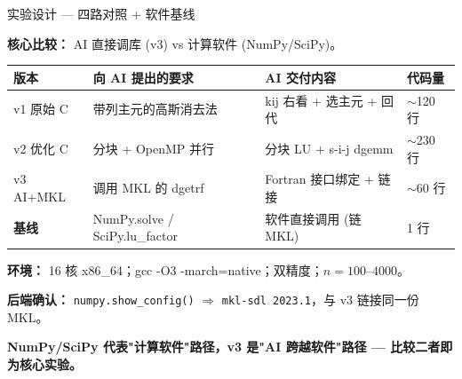 \documentclass[12pt,aspectratio=169]{beamer}
\begin{document}
\begin{frame}[shrink]{实验设计 — 四路对照 + 软件基线}

\textbf{核心比较：} AI 直接调库 (v3) vs 计算软件 (NumPy/SciPy)。

\vspace{4pt}
\footnotesize
\begin{center}
\renewcommand{\arraystretch}{1.2}
\begin{tabular}{@{}l p{4.3cm} p{4.7cm} p{1.6cm}@{}}
\toprule
\textbf{版本} & \textbf{向 AI 提出的要求} & \textbf{AI 交付内容} & \textbf{代码量} \\
\midrule
v1 原始 C   & 带列主元的高斯消去法 & kij 右看 + 选主元 + 回代 & $\sim$120 行 \\
v2 优化 C   & 分块 + OpenMP 并行 & 分块 LU + s-i-j dgemm & $\sim$230 行 \\
v3 AI+MKL   & 调用 MKL 的 dgetrf & Fortran 接口绑定 + 链接 & $\sim$60 行 \\
\textbf{基线} & NumPy.solve / SciPy.lu\_factor & 软件直接调用 (链 MKL) & 1 行 \\
\bottomrule
\end{tabular}
\end{center}
\normalsize

\vspace{4pt}
\small
\textbf{环境：} 16 核 x86\_64；gcc -O3 -march=native；双精度；$n=100$–$4000$。

\textbf{后端确认：} \texttt{numpy.show\_config()} $\Rightarrow$ \texttt{mkl-sdl 2023.1}，与 v3 链接同一份 MKL。

\vspace{4pt}
\begin{center}
\textbf{NumPy/SciPy 代表"计算软件"路径，v3 是"AI 跨越软件"路径 — 比较二者即为核心实验。}
\end{center}
\end{frame}
\end{document}
